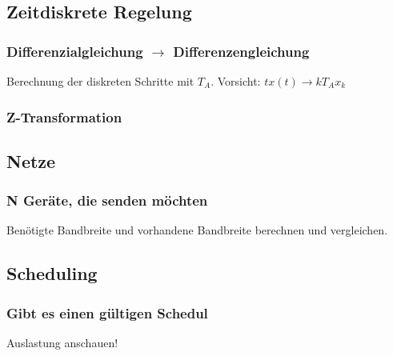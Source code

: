 \subsection{Zeitdiskrete Regelung}

\subsubsection{Differenzialgleichung \(\rightarrow\) Differenzengleichung}
Berechnung der diskreten Schritte mit \(T_A\). Vorsicht: \(tx(t) \rightarrow kT_Ax_k\)

\subsubsection{Z-Transformation}


\subsection{Netze}

\subsubsection{N Geräte, die senden möchten}
Benötigte Bandbreite und vorhandene Bandbreite berechnen und vergleichen.


\subsection{Scheduling}

\subsubsection{Gibt es einen gültigen Schedul}
Auslastung anschauen!
